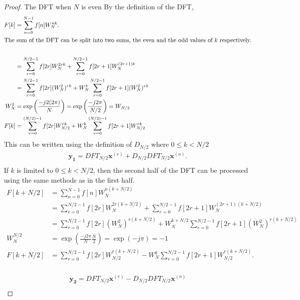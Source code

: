 \begin{proof}{The DFT when $N$ is even}
By the definition of the DFT,
    \begin{align*}
         F[k]&=\sum^{N-1}_{n=0}f[n]W_N^{nk}.\\
        \intertext{The sum of the DFT can be split into two sums, the even and the odd values of $k$ respectively.}\\
        &=\sum^{N/2-1}_{r=0}f[2r]W_N^{2rk}+\sum^{N/2-1}_{r=0}f[2r+1]W_N^{(2r+1)k}\\
        &=\sum^{N/2-1}_{r=0}f[2r](W_N^2)^{rk}+W_N^k\sum^{N/2-1}_{r=0}f[2r+1](W_N^2)^{rk}\\
        W_N^2 &= \exp\left(\frac{-j2(2\pi)}{N}\right) = \exp\left(\frac{-j2\pi}{N/2}\right) = W_{N/2}\\
        F[k] &= \sum^{(N/2)-1}_{r=0}f[2r]W^{rk}_{N/2}+W^k_N\sum^{(N/2)-1}_{r=0}f[2r+1]W^{rk}_{N/2}\\
    \end{align*}
     This can be written using the definition of $D_{N/2}$ where $0 \leq k < N/2$
     \begin{align*}
        \mathbf{y_1}=DFT_{N/2}\mathbf{x}^{(e)}+D_{N/2}DFT_{N/2}\mathbf{x}^{(o)}.\\ 
     \end{align*}
    If $k$ is limited to $0 \leq k < N/2$, then the second half of the DFT can be processed using the same methods as in the first half.
    \begin{align*}
        F[k+N/2] &= \sum^{N-1}_{n=0}f[n]W_N^{n(k+N/2)}\\
        &=\sum^{N/2-1}_{r=0}f[2r]W_N^{2r(k+N/2)}+\sum^{N/2-1}_{r=0}f[2r+1]W_N^{(2r+1)(k+N/2)}\\
        &=\sum^{N/2-1}_{r=0}f[2r](W_N^2)^{r(k+N/2)}+W_N^{k+N/2}\sum^{N/2-1}_{r=0}f[2r+1](W_N^2)^{r(k+N/2)}\\
        W_N^{N/2}&=\exp\left(\frac{-j2\pi}{N}\frac{N}{2}\right)=\exp\left(-j\pi\right)=-1\\
        F[k+N/2] &=\sum^{N/2-1}_{r=0}f[2r]W_{N/2}^{r(k+N/2)}-W_N^{k}\sum^{N/2-1}_{r=0}f[2r+1]W_{N/2}^{r(k+N/2)}.\\
    \end{align*}
    
    \begin{align*}
        \mathbf{y_2}=DFT_{N/2}\mathbf{x}^{(e)}-D_{N/2}DFT_{N/2}\mathbf{x}^{(o)}\\ 
     \end{align*}
\end{proof}

